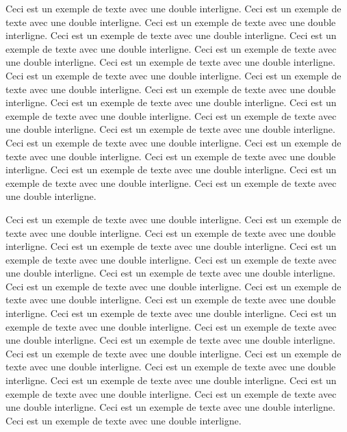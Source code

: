 \documentclass[12pt]{report}
\begin{document}
Ceci est un exemple de texte avec une double interligne. 
Ceci est un exemple de texte avec une double interligne. 
Ceci est un exemple de texte avec une double interligne. 
Ceci est un exemple de texte avec une double interligne. 
Ceci est un exemple de texte avec une double interligne. 
Ceci est un exemple de texte avec une double interligne. 
Ceci est un exemple de texte avec une double interligne. 
Ceci est un exemple de texte avec une double interligne. 
Ceci est un exemple de texte avec une double interligne. 
Ceci est un exemple de texte avec une double interligne. 
Ceci est un exemple de texte avec une double interligne. 
Ceci est un exemple de texte avec une double interligne. 
Ceci est un exemple de texte avec une double interligne. 
Ceci est un exemple de texte avec une double interligne. 
Ceci est un exemple de texte avec une double interligne. 
Ceci est un exemple de texte avec une double interligne. 
Ceci est un exemple de texte avec une double interligne. 
Ceci est un exemple de texte avec une double interligne. 
Ceci est un exemple de texte avec une double interligne. 
Ceci est un exemple de texte avec une double interligne. 

Ceci est un exemple de texte avec une double interligne. 
Ceci est un exemple de texte avec une double interligne. 
Ceci est un exemple de texte avec une double interligne. 
Ceci est un exemple de texte avec une double interligne. 
Ceci est un exemple de texte avec une double interligne. 
Ceci est un exemple de texte avec une double interligne. 
Ceci est un exemple de texte avec une double interligne. 
Ceci est un exemple de texte avec une double interligne. 
Ceci est un exemple de texte avec une double interligne. 
Ceci est un exemple de texte avec une double interligne. 
Ceci est un exemple de texte avec une double interligne. 
Ceci est un exemple de texte avec une double interligne. 
Ceci est un exemple de texte avec une double interligne. 
Ceci est un exemple de texte avec une double interligne. 
Ceci est un exemple de texte avec une double interligne. 
Ceci est un exemple de texte avec une double interligne. 
Ceci est un exemple de texte avec une double interligne. 
Ceci est un exemple de texte avec une double interligne. 
Ceci est un exemple de texte avec une double interligne. 
Ceci est un exemple de texte avec une double interligne. 
Ceci est un exemple de texte avec une double interligne. 
Ceci est un exemple de texte avec une double interligne.

\singlespacing
\end{document}
